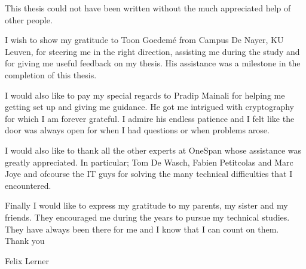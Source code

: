This thesis could not have been written without the much appreciated help of other people.

I wish to show my gratitude to Toon Goedem{\'e} from Campus De Nayer, KU Leuven, for steering me in the right direction, assisting me during the study and for giving me useful feedback on my thesis. His assistance was a milestone in the completion of this thesis.

I would also like to pay my special regards to Pradip Mainali for helping me getting set up and giving me guidance. He got me intrigued with cryptography for which I am forever grateful. I admire his endless patience and I felt like the door was always open for when I had questions or when problems arose.

 I would also like to thank all the other experts at OneSpan whose assistance was greatly appreciated. In particular; Tom De Wasch, Fabien Petitcolas and Marc Joye and ofcourse the IT guys for solving the many technical difficulties that I encountered.

Finally I would like to express my gratitude to my parents, my sister and my friends. They encouraged me during the years to pursue my technical studies. They have always been there for me and I know that I can count on them.\\

Thank you

Felix Lerner
